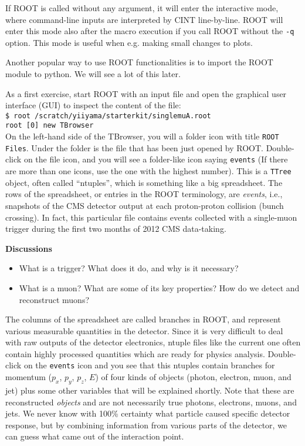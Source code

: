\documentclass[12pt]{article}
\newcommand{\terminal}[1]{\vspace{3pt}\texttt{\$ #1} \\}
\newcommand{\rterminal}[2]{\vspace{3pt}\texttt{root [#1] #2} \\}
\newenvironment{discussions}{%
\vspace{0.2in}%
\textbf{Discussions}%
\begin{itemize}%
}{%
\end{itemize}%
}
\begin{document}
If ROOT is called without any argument, it will enter the interactive mode, where command-line inputs are interpreted by CINT line-by-line. ROOT will enter this mode also after the macro execution if you call ROOT without the \texttt{-q} option. This mode is useful when e.g. making small changes to plots.

Another popular way to use ROOT functionalities is to import the ROOT module to python. We will see a lot of this later.

As a first exercise, start ROOT with an input file and open the graphical user interface (GUI) to inspect the content of the file: \\
\terminal{root /scratch/yiiyama/starterkit/singlemuA.root}
\rterminal{0}{new TBrowser}
On the left-hand side of the TBrowser, you will a folder icon with title \texttt{ROOT Files}. Under the folder is the file that has been just opened by ROOT. Double-click on the file icon, and you will see a folder-like icon saying \texttt{events} (If there are more than one icons, use the one with the highest number). This is a \texttt{TTree} object, often called ``ntuples'', which is something like a big spreadsheet. The rows of the spreadsheet, or entries in the ROOT terminology, are \textit{events}, i.e., snapshots of the CMS detector output at each proton-proton collision (bunch crossing). In fact, this particular file contains events collected with a single-muon trigger during the first two months of 2012 CMS data-taking.

\begin{discussions}
\item What is a trigger? What does it do, and why is it necessary?
\item What is a muon? What are some of its key properties? How do we detect and reconstruct muons?
\end{discussions}

The columns of the spreadsheet are called branches in ROOT, and represent various measurable quantities in the detector. Since it is very difficult to deal with raw outputs of the detector electronics, ntuple files like the current one often contain highly processed quantities which are ready for physics analysis. Double-click on the \texttt{events} icon and you see that this ntuples contain branches for momentum ($p_{x}$, $p_{y}$, $p_{z}$, $E$) of four kinds of objects (photon, electron, muon, and jet) plus some other variables that will be explained shortly. Note that these are reconstructed \textit{objects} and are not necessarily true photons, electrons, muons, and jets. We never know with 100\% certainty what particle caused specific detector response, but by combining information from various parts of the detector, we can guess what came out of the interaction point.
\end{document}
